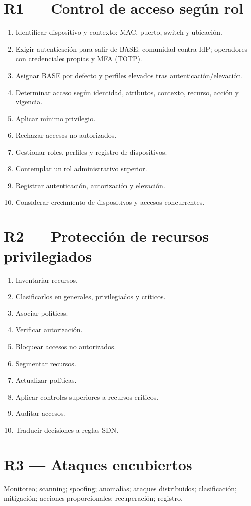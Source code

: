 \documentclass[11pt,a4paper]{report}
\begin{document}
\section{R1 --- Control de acceso según rol}
\begin{enumerate}[label=R1.\arabic*.]
\item Identificar dispositivo y contexto: MAC, puerto, switch y ubicación.
\item Exigir autenticación para salir de BASE: comunidad contra IdP; operadores con credenciales propias y MFA (TOTP).
\item Asignar BASE por defecto y perfiles elevados tras autenticación/elevación.
\item Determinar acceso según identidad, atributos, contexto, recurso, acción y vigencia.
\item Aplicar mínimo privilegio.
\item Rechazar accesos no autorizados.
\item Gestionar roles, perfiles y registro de dispositivos.
\item Contemplar un rol administrativo superior.
\item Registrar autenticación, autorización y elevación.
\item Considerar crecimiento de dispositivos y accesos concurrentes.
\end{enumerate}

\section{R2 --- Protección de recursos privilegiados}
\begin{enumerate}[label=R2.\arabic*.]
\item Inventariar recursos.
\item Clasificarlos en generales, privilegiados y críticos.
\item Asociar políticas.
\item Verificar autorización.
\item Bloquear accesos no autorizados.
\item Segmentar recursos.
\item Actualizar políticas.
\item Aplicar controles superiores a recursos críticos.
\item Auditar accesos.
\item Traducir decisiones a reglas SDN.
\end{enumerate}

\section{R3 --- Ataques encubiertos}
Monitoreo; scanning; spoofing; anomalías; ataques distribuidos; clasificación; mitigación; acciones proporcionales; recuperación; registro.
\end{document}

